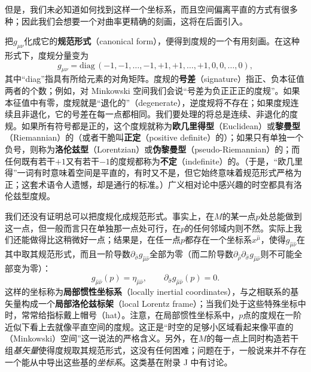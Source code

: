 
但是，我们未必知道如何找到这样一个坐标系，而且空间偏离平直的方式有很多种；因此我们会想要一个对曲率更精确的刻画，这将在后面引入。

把$g_{\mu\nu}$化成它的\textbf{规范形式}（canonical form），便得到度规的一个有用刻画。在这种形式下，度规分量变为
\begin{equation*}
g_{\mu\nu}=\mathrm{diag}\,(-1,-1,\ldots,-1,+1,+1,\ldots,+1,0,0,\ldots,0),
\tag{2.46}
\end{equation*}
其中“diag”指具有所给元素的对角矩阵。度规的\textbf{号差}（signature）指正、负本征值两者的个数；例如，对 Minkowski 空间我们会说“号差为负正正正的度规”。如果本征值中有零，度规就是“退化的”（degenerate），逆度规将不存在；如果度规连续且非退化，它的号差在每一点都相同。我们要处理的将总是连续、非退化的度规。如果所有符号都是正的，这个度规就称为\textbf{欧几里得型}（Euclidean）或\textbf{黎曼型}（Riemannian）的（或者干脆叫\textbf{正定}（positive definite）的）；如果只有单独一个负号，则称为\textbf{洛伦兹型}（Lorentzian）或\textbf{伪黎曼型}（pseudo-Riemannian）的；而任何既有若干$+1$又有若干$-1$的度规都称为\textbf{不定}（indefinite）的。（于是，“欧几里得”一词有时意味着空间是平直的，有时又不是，但它始终意味着规范形式严格为正；这套术语令人遗憾，却是通行的标准。）广义相对论中感兴趣的时空都具有洛伦兹型度规。

我们还没有证明总可以把度规化成规范形式。事实上，在$M$的某一点$p$处总能做到这一点，但一般而言只在单独那一点处可行，在$p$的任何邻域内则不然。实际上我们还能做得比这稍微好一点；结果是，在任一点$p$都存在一个坐标系$x^{\hat\mu}$，使得$g_{\hat\mu\hat\nu}$在其中取其规范形式，而且一阶导数$\partial_{\hat\sigma}g_{\hat\mu\hat\nu}$全部为零（而二阶导数$\partial_{\hat\rho}\partial_{\hat\sigma}g_{\hat\mu\hat\nu}$则不可能全部变为零）：
\begin{equation*}
g_{\hat\mu\hat\nu}(p)=\eta_{\hat\mu\hat\nu},\qquad \partial_{\hat\sigma}g_{\hat\mu\hat\nu}(p)=0.
\tag{2.47}
\end{equation*}
这样的坐标称为\textbf{局部惯性坐标系}（locally inertial coordinates），与之相联系的基矢量构成一个\textbf{局部洛伦兹标架}（local Lorentz frame）；当我们处于这些特殊坐标中时，常常给指标戴上帽号（hat）。注意，在局部惯性坐标系中，$p$点的度规在一阶近似下看上去就像平直空间的度规。这正是“时空的足够小区域看起来像平直的（Minkowski）空间”这一说法的严格含义。另外，在$M$的每一点上同时构造若干组\emph{基矢量}使得度规取其规范形式，这没有任何困难；问题在于，一般说来并不存在一个能从中导出这些基的\emph{坐标系}。这类基在附录 J 中有讨论。

